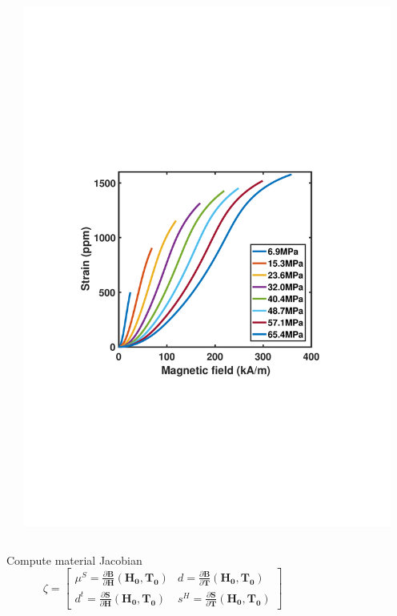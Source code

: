 \documentclass[compress]{beamer}
\begin{document}
\begin{frame}
\begin{columns}[totalwidth=\textwidth]
\begin{column}{.5\textwidth}
   \end{column}
   \begin{column}{.5\textwidth} 
   \includegraphics[width=0.95\textwidth]{Graphic/02_SHterfenol.pdf}
   \end{column}
\end{columns}	
\begin{columns}[totalwidth=\textwidth] 
   \begin{column}{.6\textwidth}
   Compute material Jacobian
  \begin{equation*}
\zeta
=\begin{bmatrix}
      \mu^S = \frac{\partial \boldsymbol{B}}{\partial \boldsymbol{H}}(\boldsymbol{H_0},\boldsymbol{T_0})  & d = \frac{\partial \boldsymbol{B}}{\partial \boldsymbol{T}}(\boldsymbol{H_0},\boldsymbol{T_0})  \\[0.3em]
       d^t = \frac{\partial \boldsymbol{S}}{\partial \boldsymbol{H}}(\boldsymbol{H_0},\boldsymbol{T_0})  & s^H = \frac{\partial \boldsymbol{S}}{\partial \boldsymbol{T}}(\boldsymbol{H_0},\boldsymbol{T_0})
\end{bmatrix} 
	\end{equation*}
   \end{column}
   \begin{column}{.35\textwidth} 
   \end{column}
\end{columns}	
\end{frame}
\end{document}
